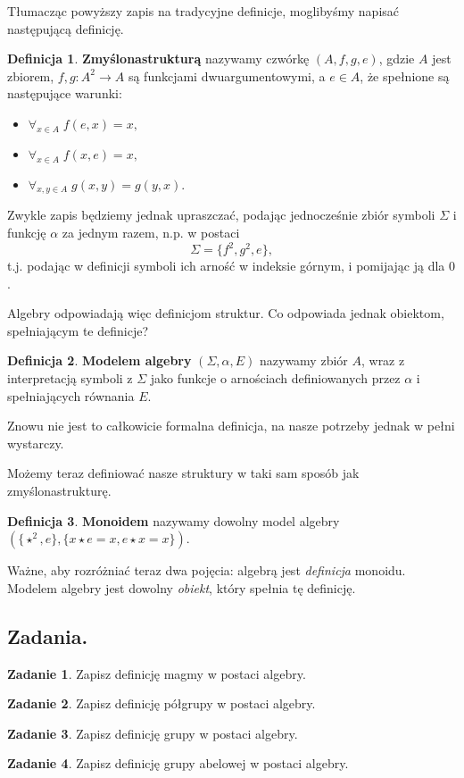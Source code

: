 \documentclass{article}
\theoremstyle{definition}
\newtheorem{definition}{Definicja}[section]
\newtheorem{exercise}{Zadanie}[section]
\begin{document}
Tłumacząc powyższy zapis na tradycyjne definicje, moglibyśmy napisać następującą definicję.
\begin{definition}
	\textbf{Zmyślonastrukturą} nazywamy czwórkę $(A, f, g, e)$, gdzie $A$ jest zbiorem, $f, g: A^2 \to A$ są funkcjami dwuargumentowymi, a $e \in A$, że spełnione są następujące warunki:
	\begin{itemize}
		\item $\forall_{x\in A}\; f(e, x) = x,$
		\item $\forall_{x\in A}\; f(x, e) = x,$
		\item $\forall_{x,y\in A}\; g(x, y) = g(y, x).$
	\end{itemize}
\end{definition}

Zwykle zapis będziemy jednak upraszczać, podając jednocześnie zbiór symboli $\Sigma$ i funkcję $\alpha$ za jednym razem, n.p. w postaci
\begin{equation}
	\Sigma = \{f^2, g^2, e\},
\end{equation}
t.j. podając w definicji symboli ich arność w indeksie górnym, i pomijając ją dla $0$.

Algebry odpowiadają więc definicjom struktur.
Co odpowiada jednak obiektom, spełniającym te definicje?

\begin{definition}
	\textbf{Modelem algebry} $(\Sigma, \alpha, E)$ nazywamy zbiór $A$,
	wraz z interpretacją symboli z $\Sigma$ jako funkcje o arnościach definiowanych przez $\alpha$ i spełniających równania $E$.
\end{definition}
Znowu nie jest to całkowicie formalna definicja,
na nasze potrzeby jednak w pełni wystarczy.

Możemy teraz definiować nasze struktury w taki sam sposób jak zmyślonastrukturę.
\begin{definition}
	\textbf{Monoidem} nazywamy dowolny model algebry $(\{\star^2, e\}, \{ x \star e = x, e \star x = x \})$.
\end{definition}

Ważne, aby rozróżniać teraz dwa pojęcia: algebrą jest \textit{definicja} monoidu.
Modelem algebry jest dowolny \textit{obiekt}, który spełnia tę definicję.

\subsection{Zadania.}

\begin{exercise}
	Zapisz definicję magmy w postaci algebry.
\end{exercise}
\begin{exercise}
	Zapisz definicję półgrupy w postaci algebry.
\end{exercise}
\begin{exercise}
	Zapisz definicję grupy w postaci algebry.
\end{exercise}
\begin{exercise}
	Zapisz definicję grupy abelowej w postaci algebry.
\end{exercise}
\end{document}
